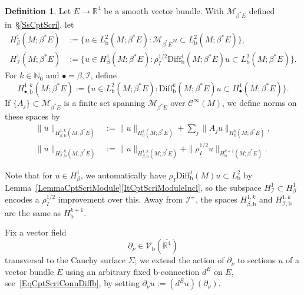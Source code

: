 \documentclass[reqno,11pt,letterpaper]{amsart}
\numberwithin{equation}{section}
\numberwithin{figure}{section}
\theoremstyle{definition}
\newtheorem{definition}[thm]{Definition}
\theoremstyle{remark}
\newcommand{\mc}{\mathcal}
\newcommand{\cC}{\mc C}
\newcommand{\cM}{\mc M}
\newcommand{\ms}{\mathscr}
\newcommand{\scri}{\ms I}
\newcommand{\N}{\mathbb{N}}
\newcommand{\R}{\mathbb{R}}
\newcommand{\ol}{\overline}
\newcommand{\pa}{\partial}
\newcommand{\bop}{{\mathrm{b}}}
\newcommand{\Diff}{\mathrm{Diff}}
\newcommand{\Vf}{\mathcal V}
\newcommand{\Vb}{\Vf_\bop}
\newcommand{\Diffb}{\Diff_\bop}
\newcommand{\CI}{\cC^\infty}
\newcommand{\Hb}{H_{\bop}}
\newcommand{\Hbeta}{H_{\beta}}
\newcommand{\Hbetab}{H_{\beta,\bop}}
\newcommand{\Hscri}{H_{\scri}}
\newcommand{\Hscrib}{H_{\scri,\bop}}
\begin{document}
\begin{definition}
\label{DefBgHscri}
  Let $E\to\ol{\R^4}$ be a smooth vector bundle. With $\cM_{\beta^*E}$ defined in~\S\ref{SsCptScri}, let
  \begin{align*}
    \Hbeta^1(M;\beta^*E) &:= \{ u\in L^2_\bop(M;\beta^*E) \colon \cM_{\beta^*E}u\subset L^2_\bop(M;\beta^*E) \}, \\
    \Hscri^1(M;\beta^*E) &:= \{ u\in \Hbeta^1(M;\beta^*E) \colon \rho_I^{1/2}\Diffb^1(M;\beta^*E)u\subset L^2_\bop(M;\beta^*E) \}.
  \end{align*}
  For $k\in\N_0$ and $\bullet=\beta,\scri$, define
  \[
    H_{\bullet,\bop}^{1,k}(M;\beta^*E) := \{ u\in L^2_\bop(M;\beta^*E) \colon \Diffb^k(M;\beta^*E)u\subset H_{\bullet}^1(M;\beta^*E) \}.
  \]
    If $\{A_j\}\subset\cM_{\beta^*E}$ is a finite set spanning $\cM_{\beta^*E}$ over $\CI(M)$, we define norms on these spaces by
    \begin{align*}
      \| u \|_{\Hbetab^{1,k}(M;\beta^*E)} &:= \|u\|_{\Hb^k(M;\beta^*E)} + \sum_j \|A_j u\|_{\Hb^k(M;\beta^*E)}, \\
      \| u \|_{\Hscrib^{1,k}(M;\beta^*E)} &:= \|u\|_{\Hbetab^{1,k}(M;\beta^*E)} + \|\rho_I^{1/2}u\|_{\Hb^{k+1}(M;\beta^*E)}.
    \end{align*}
\end{definition}

Note that for $u\in\Hbeta^1$, we automatically have $\rho_I\Diffb^1(M)u\subset L^2_\bop$ by Lemma~\ref{LemmaCptScriModule}\eqref{ItCptScriModuleIncl}, so the subspace $\Hscri^1\subset\Hbeta^1$ encodes a $\rho_I^{1/2}$ improvement over this. Away from $\scri^+$, the spaces $\Hbetab^{1,k}$ and $\Hscrib^{1,k}$ are the same as $\Hb^{k+1}$.

Fix a vector field
\begin{equation}
\label{EqBgPartialNu}
  \pa_\nu\in\Vb(\ol{\R^4})
\end{equation}
transversal to the Cauchy surface $\Sigma$; we extend the action of $\pa_\nu$ to sections $u$ of a vector bundle $E$ using an arbitrary fixed b-connection $d^E$ on $E$, see~\eqref{EqCptScriConnDiffb}, by setting $\pa_\nu u:=(d^E u)(\pa_\nu)$.
\end{document}
